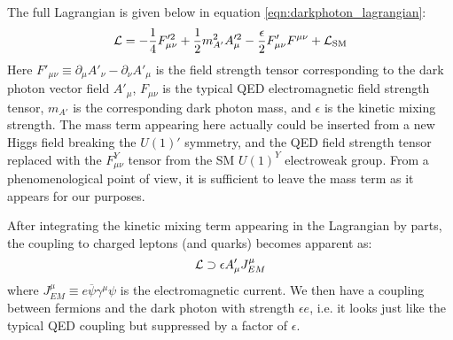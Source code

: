 The full Lagrangian is given below in equation \ref{eqn:darkphoton_lagrangian}:
\begin{equation}
\label{eqn:darkphoton_lagrangian}
\operatorname{\mathcal{L}} = -\frac{1}{4}F'^2_{\mu\nu} + \frac{1}{2}m_{A'}^2 A'^2_\mu - \frac{\epsilon}{2}F'_{\mu\nu} F^{\mu\nu} + \operatorname{\mathcal{L}}_{\textrm{SM}}
\end{equation}
Here $F'_{\mu\nu} \equiv \partial_\mu A'_\nu - \partial_\nu A'_\mu$ is the field strength tensor corresponding to the dark photon vector field $A'_\mu$, $F_{\mu\nu}$ is the typical QED electromagnetic field strength tensor, $m_{A'}$ is the corresponding dark photon mass, and $\epsilon$ is the kinetic mixing strength.
The mass term appearing here actually could be inserted from a new Higgs field breaking the $U(1)'$ symmetry, and the QED field strength tensor replaced with the $F^Y_{\mu\nu}$ tensor from the SM $U(1)^Y$ electroweak group.
From a phenomenological point of view, it is sufficient to leave the mass term as it appears for our purposes.

After integrating the kinetic mixing term appearing in the Lagrangian by parts, the coupling to charged leptons (and quarks) becomes apparent as:
\begin{equation}
    \label{eqn:darkphoton_qed_current}
    \operatorname{\mathcal{L}} \supset \epsilon A'_\mu J^\mu_{EM}
\end{equation}
where $J^\mu_{EM} \equiv e \overbar{\psi} \gamma^\mu \psi$ is the electromagnetic current.
We then have a coupling between fermions and the dark photon with strength $\epsilon e$, i.e. it looks just like the typical QED coupling but suppressed by a factor of $\epsilon$.
